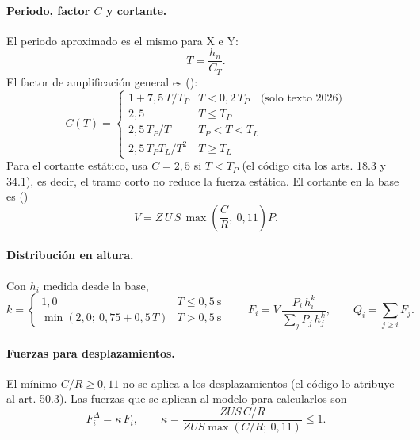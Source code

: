 \paragraph{Periodo, factor $C$ y cortante.} El periodo aproximado es el mismo para X e Y:
\begin{equation}
	T = \frac{h_n}{C_T} .
	\label{eq:sis-periodo}
\end{equation}
El factor de amplificación general es ():
\begin{equation}
	C(T) =
	\begin{cases}
		1 + 7{,}5\,T/T_P & T < 0{,}2\,T_P \quad \text{(solo texto 2026)} \\
		2{,}5 & T \le T_P \\
		2{,}5\,T_P/T & T_P < T < T_L \\
		2{,}5\,T_P T_L/T^2 & T \ge T_L
	\end{cases}
	\label{eq:sis-c}
\end{equation}
Para el cortante estático,  usa $C = 2{,}5$ si $T < T_P$ (el código cita los arts. 18.3 y 34.1), es
decir, el tramo corto no reduce la fuerza estática. El cortante en la base es ()
\begin{equation}
	V = Z\,U\,S\,\max\!\left(\frac{C}{R},\ 0{,}11\right) P .
	\label{eq:sis-cortante}
\end{equation}

\paragraph{Distribución en altura.} Con $h_i$ medida desde la base,
\begin{equation}
	k =
	\begin{cases}
		1{,}0 & T \le 0{,}5~\text{s} \\
		\min(2{,}0;\ 0{,}75 + 0{,}5\,T) & T > 0{,}5~\text{s}
	\end{cases}
	\qquad
	F_i = V\,\frac{P_i\,h_i^{k}}{\sum_j P_j\,h_j^{k}}, \qquad Q_i = \sum_{j \ge i} F_j .
	\label{eq:sis-distribucion}
\end{equation}

\paragraph{Fuerzas para desplazamientos.} El mínimo $C/R \ge 0{,}11$ no se aplica a los desplazamientos (el código lo
atribuye al art. 50.3). Las fuerzas que se aplican al modelo para calcularlos son
\begin{equation}
	F^{\Delta}_i = \kappa\,F_i, \qquad \kappa = \frac{Z U S\, C/R}{Z U S \max(C/R;\ 0{,}11)} \le 1 .
	\label{eq:sis-reduccion}
\end{equation}

